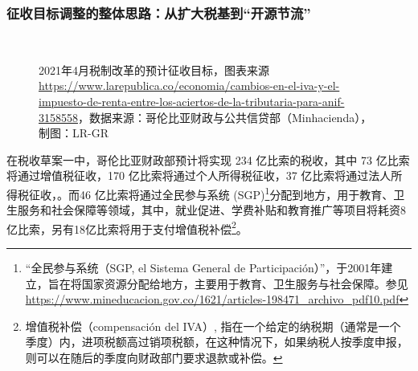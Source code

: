 \documentclass{phyasgn}\usepackage{nag}
\begin{document}
\subsubsection{征收目标调整的整体思路：从扩大税基到“开源节流”}
\begin{figure}[!h]
	\centering
	\vspace{-0.3\baselineskip}
	\quad
	\\
	\caption{2021年4月税制改革的预计征收目标，图表来源\footnotesize{\url{https://www.larepublica.co/economia/cambios-en-el-iva-y-el-impuesto-de-renta-entre-los-aciertos-de-la-tributaria-para-anif-3158558}}，数据来源：哥伦比亚财政与公共信贷部（Minhacienda），制图：LR-GR
}
	\end{figure}
    \par 在税收草案一中，哥伦比亚财政部预计将实现 234 亿比索的税收，其中 73 亿比索将通过增值税征收，170 亿比索将通过个人所得税征收，37 亿比索将通过法人所得税征收，。而46 亿比索将通过全民参与系统 (SGP)\footnote[23]{“全民参与系统（SGP, el Sistema General de Participación）”，于2001年建立，旨在将国家资源分配给地方，主要用于教育、卫生服务与社会保障。参见\url{https://www.mineducacion.gov.co/1621/articles-198471_archivo_pdf10.pdf}}分配到地方，用于教育、卫生服务和社会保障等领域，其中，就业促进、学费补贴和教育推广等项目将耗资8亿比索，另有18亿比索将用于支付增值税补偿\footnote[24]{增值税补偿（compensación del IVA）, 指在一个给定的纳税期（通常是一个季度）内，进项税额高过销项税额，在这种情况下，如果纳税人按季度申报，则可以在随后的季度向财政部门要求退款或补偿。}。
\end{document}
